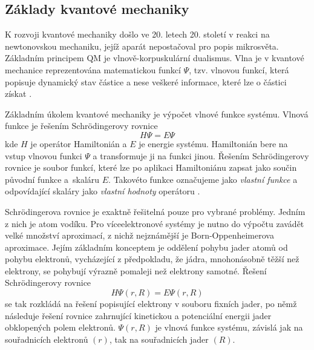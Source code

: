 \subsection{Základy kvantové mechaniky}
K rozvoji kvantové mechaniky došlo ve 20. letech 20. století v reakci na newtonovskou mechaniku, jejíž aparát nepostačoval pro popis mikrosvěta.  
Základním principem QM je vlnově-korpuskulární dualismus. %
Vlna je v kvantové mechanice reprezentována matematickou funkcí $\Psi$, tzv. vlnovou funkcí, která popisuje dynamický stav částice a nese veškeré informace, které lze o částici získat \cite{Cely}. %

Základním úkolem kvantové mechaniky je výpočet vlnové funkce systému.
Vlnová funkce je řešením Schrödingerovy rovnice $$ H\Psi = E\Psi$$ kde $H$ je operátor Hamiltonián a $E$
 je energie systému. Hamiltonián bere na vstup vlnovou funkci $\Psi$ a transformuje ji na funkci jinou. Řešením Schrödingerovy rovnice je soubor funkcí, které lze po aplikaci Hamiltoniánu zapsat jako součin původní funkce a~skaláru $E$. Takovéto funkce označujeme jako \textit{vlastní funkce} a odpovídající skaláry jako \textit{vlastní hodnoty} operátoru \cite{Volatron}. 
 
 Schrödingerova rovnice je exaktně řešitelná pouze pro vybrané problémy. Jedním z nich je atom vodíku. Pro víceelektronové systémy je nutno do výpočtu zavádět velké množství aproximací, z nichž nejznámější je Born-Oppenheimerova aproximace. %
 Jejím základním konceptem je oddělení pohybu jader atomů od pohybu elektronů, vycházející z předpokladu, že jádra, mnohonásobně těžší než elektrony,
 se pohybují výrazně pomaleji než elektrony samotné. Řešení Schrödingerovy rovnice $$H\Psi(r, R) = E\Psi(r, R)$$se tak rozkládá na řešení popisující elektrony v souboru fixních jader, po němž následuje řešení rovnice zahrnující kinetickou a potenciální energii jader obklopených polem elektronů. $\Psi(r, R)$ je vlnová funkce systému, závislá jak na souřadnicích elektronů $(r)$, tak na souřadnicích jader $(R)$.
 

